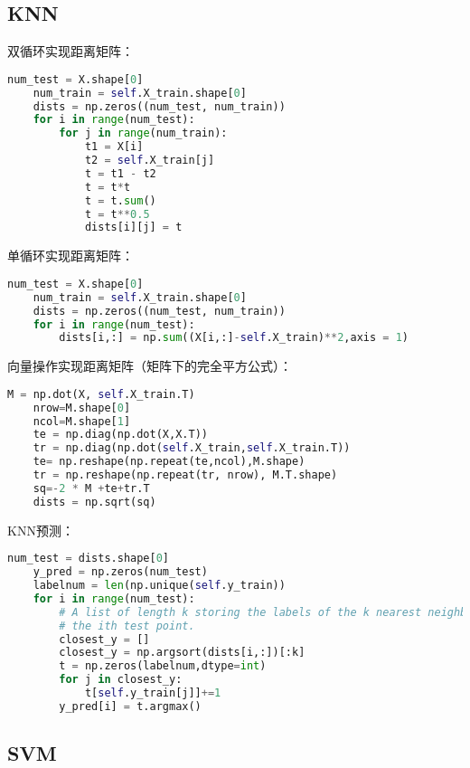 \documentclass[a4paper]{article}
\begin{document}
\subsection{KNN}
双循环实现距离矩阵：
\begin{lstlisting}[language=Python, caption=KNN双循环实现距离矩阵]
    num_test = X.shape[0]
    num_train = self.X_train.shape[0]
    dists = np.zeros((num_test, num_train))
    for i in range(num_test):
        for j in range(num_train):
            t1 = X[i]
            t2 = self.X_train[j]
            t = t1 - t2
            t = t*t
            t = t.sum()
            t = t**0.5
            dists[i][j] = t
\end{lstlisting}
单循环实现距离矩阵：
\begin{lstlisting}[language=Python, caption=KNN单循环实现距离矩阵]
    num_test = X.shape[0]
    num_train = self.X_train.shape[0]
    dists = np.zeros((num_test, num_train))
    for i in range(num_test):
        dists[i,:] = np.sum((X[i,:]-self.X_train)**2,axis = 1)
\end{lstlisting}
向量操作实现距离矩阵（矩阵下的完全平方公式）：
\begin{lstlisting}[language=Python, caption=KNN向量操作实现距离矩阵]
    M = np.dot(X, self.X_train.T)
    nrow=M.shape[0]
    ncol=M.shape[1]
    te = np.diag(np.dot(X,X.T))
    tr = np.diag(np.dot(self.X_train,self.X_train.T))
    te= np.reshape(np.repeat(te,ncol),M.shape)
    tr = np.reshape(np.repeat(tr, nrow), M.T.shape)
    sq=-2 * M +te+tr.T
    dists = np.sqrt(sq)
\end{lstlisting}
KNN预测：
\begin{lstlisting}[language=Python, caption=KNN预测]
    num_test = dists.shape[0]
    y_pred = np.zeros(num_test)
    labelnum = len(np.unique(self.y_train))
    for i in range(num_test):
        # A list of length k storing the labels of the k nearest neighbors to
        # the ith test point.
        closest_y = []
        closest_y = np.argsort(dists[i,:])[:k]
        t = np.zeros(labelnum,dtype=int)
        for j in closest_y:
            t[self.y_train[j]]+=1
        y_pred[i] = t.argmax()
\end{lstlisting}

\subsection{SVM}
\end{document}
